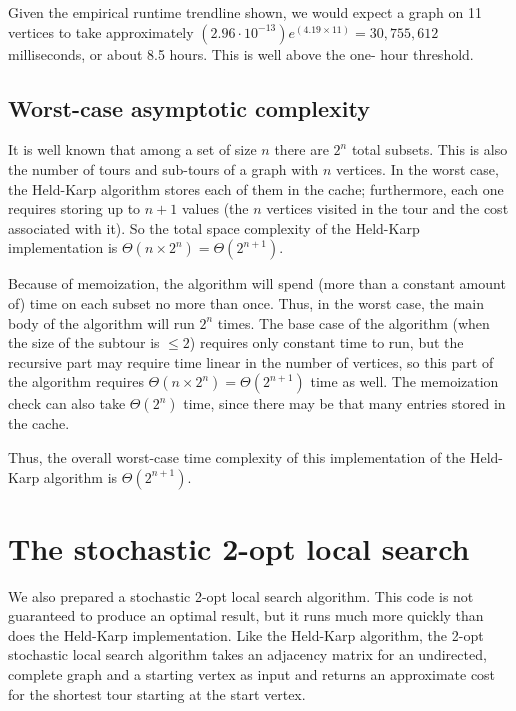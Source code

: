 \documentclass[10pt]{extarticle}
\begin{document}
Given the empirical runtime trendline shown, we would expect a graph on 11
vertices to take approximately $(2.96 \cdot 10^{-13})e^{(4.19 \times 11)} =
30,755,612$ milliseconds, or about 8.5 hours. This is well above the one-
hour threshold.


\subsection{Worst-case asymptotic complexity}
It is well known that among a set of size $n$ there are $2^n$ total subsets.
This is also the number of tours and sub-tours of a graph with $n$ vertices.
In the worst case, the Held-Karp algorithm stores each of them in the cache;
furthermore, each one requires storing up to $n+1$ values (the $n$ vertices
visited in the tour and the cost associated with it). So the total space
complexity of the Held-Karp implementation is $\Theta(n \times 2^n) = 
\Theta(2^{n+1})$.

Because of memoization, the algorithm will spend (more than a constant amount 
of) time on each subset no more than once. Thus, in the worst case, the main
body of the algorithm will run $2^n$ times. The base case of the algorithm
(when the size of the subtour is $\leq 2$) requires only constant time to run,
but the recursive part may require time linear in the number of vertices,
so this part of the algorithm requires $\Theta(n \times 2^n) = \Theta(2^{n+1})$
time as well. The memoization check can also take $\Theta(2^n)$ time, since
there may be that many entries stored in the cache. 

Thus, the overall worst-case time complexity of this implementation of the
Held-Karp algorithm is $\Theta(2^{n+1})$. \medskip



\section{The stochastic 2-opt local search}
We also prepared a stochastic 2-opt local search algorithm. This code is not
guaranteed to produce an optimal result, but it runs much more quickly than
does the Held-Karp implementation. Like the Held-Karp algorithm, the 2-opt
stochastic local search algorithm takes an adjacency matrix for an undirected,
complete graph and a starting vertex as input and returns an approximate cost
for the shortest tour starting at the start vertex.
\end{document}
